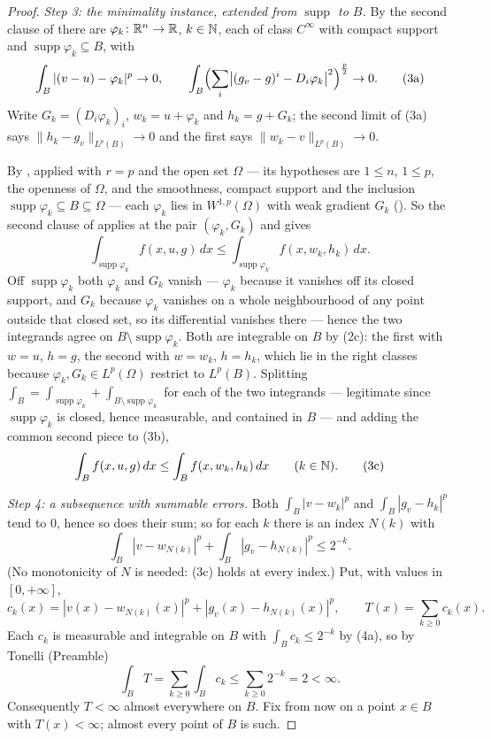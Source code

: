 \begin{proof}
\emph{Step 3: the minimality instance, extended from $\operatorname{supp}$ to
$B$.}  By the second clause of  there are
$\varphi_k\colon\mathbb{R}^n\to\mathbb{R}$, $k\in\mathbb{N}$, each of class $C^{\infty}$ with compact
support and $\operatorname{supp}\varphi_k\subseteq B$, with
\[
\int_B|(v-u)-\varphi_k|^p\to0,
\qquad
\int_B\Bigl(\sum_i\bigl|(g_v-g)^i-D_i\varphi_k\bigr|^2\Bigr)^{\frac p2}\to0 .
\tag{3a}
\]
Write $G_k=(D_i\varphi_k)_i$, $w_k=u+\varphi_k$ and $h_k=g+G_k$; the second
limit of (3a) says $\|h_k-g_v\|_{L^p(B)}\to0$ and the first says
$\|w_k-v\|_{L^p(B)}\to0$.

By , applied with $r=p$ and the open set
$\Omega$ --- its hypotheses are $1\le n$, $1\le p$, the openness of $\Omega$,
and the smoothness, compact support and the inclusion
$\operatorname{supp}\varphi_k\subseteq B\subseteq\Omega$ --- each $\varphi_k$
lies in $W^{1,p}(\Omega)$ with weak gradient $G_k$ ().  So
the second clause of  applies at the pair
$(\varphi_k,G_k)$ and gives
\[
\int_{\operatorname{supp}\varphi_k}f(x,u,g)\,dx
\le\int_{\operatorname{supp}\varphi_k}f(x,w_k,h_k)\,dx .
\tag{3b}
\]
Off $\operatorname{supp}\varphi_k$ both $\varphi_k$ and $G_k$ vanish ---
$\varphi_k$ because it vanishes off its closed support, and $G_k$ because
$\varphi_k$ vanishes on a whole neighbourhood of any point outside that closed
set, so its differential vanishes there --- hence the two integrands agree on
$B\setminus\operatorname{supp}\varphi_k$.  Both are integrable on $B$ by (2c):
the first with $w=u$, $h=g$, the second with $w=w_k$, $h=h_k$, which lie in the
right classes because $\varphi_k,G_k\in L^p(\Omega)$ restrict to $L^p(B)$.
Splitting $\int_B=\int_{\operatorname{supp}\varphi_k}+\int_{B\setminus
\operatorname{supp}\varphi_k}$ for each of the two integrands --- legitimate
since $\operatorname{supp}\varphi_k$ is closed, hence measurable, and contained
in $B$ --- and adding the common second piece to (3b),
\[
\int_Bf(x,u,g)\,dx\le\int_Bf(x,w_k,h_k)\,dx\qquad(k\in\mathbb{N}).
\tag{3c}
\]

\emph{Step 4: a subsequence with summable errors.}  Both
$\int_B|v-w_k|^p$ and $\int_B|g_v-h_k|^p$ tend to $0$, hence so does their sum;
so for each $k$ there is an index $N(k)$ with
\[
\int_B|v-w_{N(k)}|^p+\int_B|g_v-h_{N(k)}|^p\le2^{-k} .
\tag{4a}
\]
(No monotonicity of $N$ is needed: (3c) holds at every index.)  Put, with
values in $[0,+\infty]$,
\[
c_k(x)=|v(x)-w_{N(k)}(x)|^p+|g_v(x)-h_{N(k)}(x)|^p,
\qquad
T(x)=\sum_{k\ge0}c_k(x).
\]
Each $c_k$ is measurable and integrable on $B$ with
$\int_Bc_k\le2^{-k}$ by (4a), so by Tonelli (Preamble)
\[
\int_BT=\sum_{k\ge0}\int_Bc_k\le\sum_{k\ge0}2^{-k}=2<\infty .
\]
Consequently $T<\infty$ almost everywhere on $B$.  Fix from now on a point
$x\in B$ with $T(x)<\infty$; almost every point of $B$ is such.


\end{proof}

